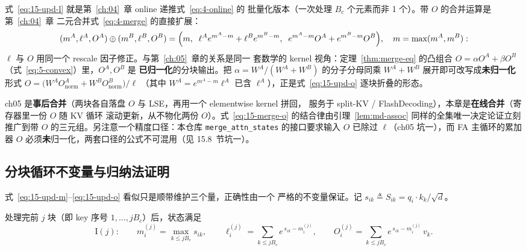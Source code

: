 式~\ref{eq:15-upd-l} 就是第~\ref{ch:04}~章 online 递推式~\ref{eq:4-online} 的
批量化版本（一次处理 $B_c$ 个元素而非 1 个）。带 $O$ 的合并运算是第~\ref{ch:04}~章
二元合并式~\ref{eq:4-merge} 的直接扩展：
\begin{equation}
  (m^{A}, \ell^{A}, O^{A}) \oplus (m^{B}, \ell^{B}, O^{B}) =
  \Bigl(m,\;\; \ell^{A} e^{m^{A}-m} + \ell^{B} e^{m^{B}-m},\;\;
  e^{m^{A}-m} O^{A} + e^{m^{B}-m} O^{B}\Bigr),
  \quad m = \max(m^{A}, m^{B}) :
  \label{eq:15-merge-o}
\end{equation}
$\ell$ 与 $O$ 用同一个 rescale 因子修正。与第~\ref{ch:05}~章的关系是同一
套数学的 kernel 视角：定理~\ref{thm:merge-eq} 的凸组合
$O = \alpha O^{A} + \beta O^{B}$（式~\ref{eq:5-convex}）里，$O^{A}, O^{B}$ 是
\textbf{已归一化}的分块输出。把 $\alpha = W^{A}/(W^{A}{+}W^{B})$ 的分子分母同乘
$W^{A}{+}W^{B}$ 展开即可改写成\textbf{未归一化}形式
$O = \bigl(W^{A} O^{A}_{\text{norm}} + W^{B} O^{B}_{\text{norm}}\bigr)/\ell$
（其中 $W^{A}=e^{m^{A}-m}\ell^{A}$ 已含 $\ell^{A}$），正是式~\ref{eq:15-upd-o} 逐块折叠的形态。

ch05 是\textbf{事后合并}（两块各自落盘 $O$ 与 LSE，再用一个 elementwise kernel 拼回，
服务于 split-KV / FlashDecoding），本章是\textbf{在线合并}（寄存器里一份 $O$ 随 KV 循环
滚动更新，从不物化两份 $O$）。式~\ref{eq:15-merge-o} 的结合律由引理~\ref{lem:md-assoc}
同样的全集唯一决定论证立刻推广到带 $O$ 的三元组。另注意一个精度口径：本仓库
\texttt{merge\_\allowbreak{}attn\_\allowbreak{}states} 的接口要求输入 $O$ 已除过 $\ell$（ch05 坑一），而 FA
主循环的累加器 $O$ 必须\textbf{未}归一化，两套口径的公式不可混用（见 15.8~节坑一）。

\subsection{分块循环不变量与归纳法证明}

式~\ref{eq:15-upd-m}--\ref{eq:15-upd-o} 看似只是顺带维护三个量，正确性由一个
严格的不变量保证。记 $s_{ik} \triangleq S_{ik} = q_i \cdot k_k/\sqrt{d}$。

\begin{definition}[分块循环不变量]\label{def:15-inv}
  处理完前 $j$ 块（即 key 序号 $1, \dots, jB_c$）后，状态满足
  \begin{equation}
    \mathrm{I}(j):\qquad
    m^{(j)}_i = \max_{k \le jB_c} s_{ik}, \qquad
    \ell^{(j)}_i = \sum_{k \le jB_c} e^{\,s_{ik} - m^{(j)}_i}, \qquad
    O^{(j)}_i = \sum_{k \le jB_c} e^{\,s_{ik} - m^{(j)}_i}\, v_k .
    \label{eq:15-invariant}
  \end{equation}
\end{definition}

